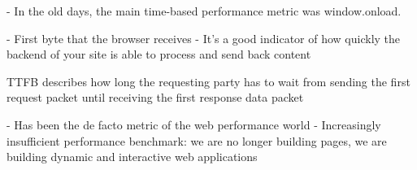 



- In the old days, the main time-based performance metric was window.onload.







- First byte that the browser receives
- It’s a good indicator of how quickly the backend of your site is able to process and send back content


TTFB describes how long the requesting party has to wait from sending the first request packet until receiving the first response data packet









- Has been the de facto metric of the web performance world
- Increasingly insufficient performance benchmark: we are no longer building pages, we are building dynamic and interactive web applications













